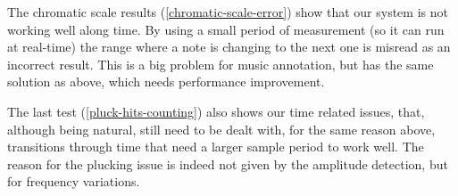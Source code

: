 The chromatic scale results (\autoref{chromatic-scale-error}) show that our system is not working well along time.
By using a small period of measurement (so it can run at real-time) the range
where a note is changing to the next one is misread as an incorrect result.
This is a big problem for music annotation, but has the same solution as above,
which needs performance improvement.

The last test (\autoref{pluck-hits-counting}) also shows our time related issues,
that, although being natural, still need to be dealt with, for the same reason above, transitions
through time that need a larger sample period to work well. The reason for the plucking
issue is indeed not given by the amplitude detection, but for frequency variations.
